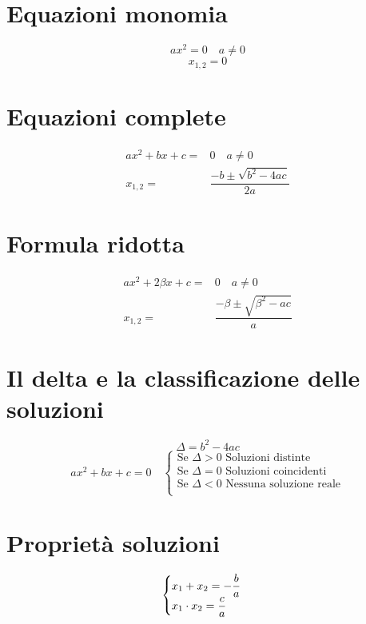 \section{Equazioni monomia}
\begin{equation*}
ax^2=0\quad a\neq 0
\end{equation*}
\begin{equation*}
x_{1,2}=0
\end{equation*}
\section{Equazioni complete}
\begin{align*}
ax^2+bx+c=&0\quad a\neq 0\\
x_{1,2}=&\dfrac{-b\pm\sqrt{b^2-4ac}}{2a}
\end{align*}
\section{Formula ridotta}
\begin{align*}
ax^2+2\beta x+c=&0\quad a\neq 0\\
x_{1,2}=&\dfrac{-\beta\pm\sqrt{\beta^2-ac}}{a}
\end{align*}
\section{Il delta e la classificazione delle soluzioni}
\begin{equation*}
\Delta=b^2-4ac
\end{equation*}
\begin{equation*}
ax^2+bx+c=0\quad\begin{cases}
\text{Se $\Delta >0$ Soluzioni distinte}\\
\text{Se $\Delta =0$ Soluzioni coincidenti}\\
\text{Se $\Delta <0$ Nessuna soluzione reale}\\
\end{cases}
\end{equation*}
\section{Proprietà soluzioni}
\begin{equation*}
\begin{cases}
x_1+x_2=-\dfrac{b}{a}\\
x_1\cdot x_2=\dfrac{c}{a}
\end{cases}\index{Equazione!secondo grado!somma soluzioni}\index{Equazione!secondo grado!prodotto soluzioni}
\end{equation*}
